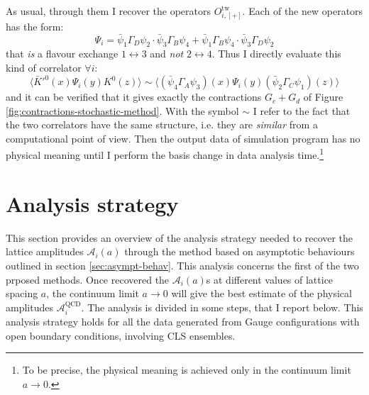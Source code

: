 \documentclass[english, LaM, oneside, noexaminfo]{sapthesis}
\begin{document}
As usual, through them I recover the operators $O_{i,[+]}^\text{tw}$.
Each of the new operators has the form:
$$\Psi_i = \bar\psi_1 \Gamma_D \psi_2 \cdot \bar\psi_3 \Gamma_B \psi_4 + \bar\psi_1 \Gamma_B \psi_4 \cdot \bar\psi_3 \Gamma_D \psi_2$$
that {\it is} a flavour exchange $1 \leftrightarrow 3$ and {\it not} $2 \leftrightarrow 4$.
Thus I directly evaluate this kind of correlator $\forall i$:
$$\bigg\langle \bar K'^0(x) \Psi_i (y) K^0(z) \bigg\rangle \sim \bigg\langle \left(\bar\psi_4 \Gamma_A \psi_3 \right) (x) \Psi_i (y) \left(\bar\psi_2 \Gamma_C \psi_1 \right) (z) \bigg\rangle$$
and it can be verified that it gives exactly the contractions $G_c + G_d$ of Figure \ref{fig:contractions-stochastic-method}.
With the symbol $\sim$ I refer to the fact that the two correlators have the same structure, i.e. they are {\it similar} from a computational point of view.
Then the output data of simulation program has no physical meaning until I perform the basis change in data analysis time.\footnote{To be precise, the physical meaning is achieved only in the continuum limit $a \rightarrow 0$.}

\section{Analysis strategy}\label{sec:analysis}
\noindent
This section provides an overview of the analysis strategy needed to recover the lattice amplitudes $\mathcal{A}_i (a)$ through the method based on asymptotic behaviours outlined in section \ref{sec:asympt-behav}.
This analysis concerns the first of the two prposed methods.
Once recovered the $\mathcal{A}_i (a)$s at different values of lattice spacing $a$, the continuum limit $a\rightarrow 0$ will give the best estimate of the physical amplitudes $\mathcal{A}_i^\text{QCD}$.
The analysis is divided in some steps, that I report below.
This analysis strategy holds for all the data generated from Gauge configurations with open boundary conditions, involving CLS ensembles.
\end{document}
